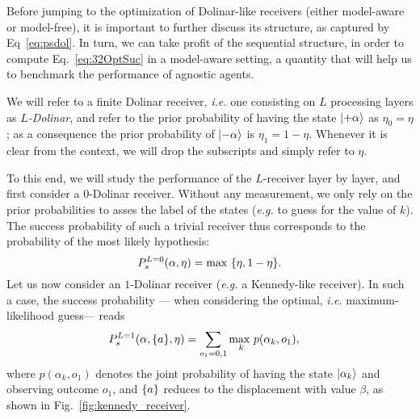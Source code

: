 Before jumping to the optimization of Dolinar-like receivers (either model-aware or model-free), it is important to further discuss its structure, as captured by Eq~\ref{eq:psdol}. In turn, we can take profit of the sequential structure, in order to compute Eq.~\ref{eq:32OptSuc} in a model-aware setting, a quantity that will help us to benchmark the performance of agnostic agents.

We will refer to a finite Dolinar receiver, \textit{i.e.} one consisting on $L$ processing layers as \textit{$L$-Dolinar}, and refer to the prior probability of having the state $\ket{+\alpha}$ as $\eta_0 = \eta$; as a consequence the prior probability of $\ket{-\alpha}$ is $\eta_1 = 1-\eta$. Whenever it is clear from the context, we will drop the subscripts and simply refer to $\eta$.

To this end, we will study the performance of the $L$-receiver layer by layer, and first consider a $0$-Dolinar receiver. Without any measurement, we only rely on the prior probabilities to asses the label of the states (\textit{e.g.} to guess for the value of $k$). The success probability of such a trivial receiver thus corresponds to the probability of the most likely hypothesis:
\begin{equation}\label{eq:0dol}
P_s^{L=0}(\alpha, \eta) = \text{max } \lbrace \eta, 1-\eta\rbrace.
\end{equation}
Let us now consider an $1$-Dolinar receiver (\textit{e.g.} a Kennedy-like receiver). In such a case, the success probability --- when considering the optimal, \textit{i.e.} maximum-likelihood guess--- reads
\begin{align}\label{eq:1dol}
P_s^{L=1}(\alpha, \lbrace a\rbrace, \eta) &= \sum_{o_1 = 0,1} \underset{k}{\text{max }} p(\alpha_k, o_1),
\end{align}
where $p(\alpha_k, o_1)$ denotes the joint probability of having the state $\ket{\alpha_k}$ and observing outcome $o_1$, and $\lbrace a\rbrace$ reduces to the displacement with value $\beta$, as shown in Fig.~\ref{fig:kennedy_receiver}.

